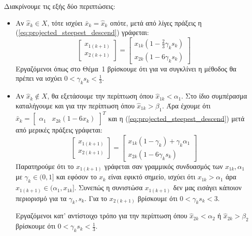 \documentclass[a4paper,12pt]{article}
\begin{document}
Διακρίνουμε τις εξής δύο περιπτώσεις:
\begin{itemize}
    \item Αν $\hat{x}_k \in X$, τότε ισχύει $\bar{x}_k = \hat{x}_k$ οπότε, μετά από λίγες πράξεις η 
    (\ref{eq:projected_steepest_descend}) γράφεται:
    \begin{equation}
        \begin{bmatrix} x_{1(k+1)} \\ x_{2(k+1)} \end{bmatrix} = 
        \begin{bmatrix} x_{1k} \left(1 - \frac{2}{3} \gamma_k s_k \right) \\ x_{2k} (1 - 6 \gamma_k s_k) \end{bmatrix}
    \end{equation}
    Εργαζόμενοι όπως στο Θέμα~1 βρίσκουμε ότι για να συγκλίνει η μέθοδος θα πρέπει να ισχύει 
    $0 < \gamma_k s_k < \frac{1}{3}$.

    \item Αν $\hat{x}_k \notin X$, θα εξετάσουμε την περίπτωση όπου $\hat{x}_{1k} < \alpha_1$.
    Στο ίδιο συμπέρασμα καταλήγουμε και για την περίπτωση όπου $\hat{x}_{1k} > \beta_1$. Άρα έχουμε
    ότι $\bar{x}_k = \begin{bmatrix} \alpha_1 & x_{2k} (1 - 6 x_k)\end{bmatrix}^T$ και η 
    (\ref{eq:projected_steepest_descend}) μετά από μερικές πράξεις γράφεται:
    \begin{equation}
        \begin{bmatrix} x_{1(k+1)} \\ x_{2(k+1)} \end{bmatrix} = 
        \begin{bmatrix} x_{1k} (1 - \gamma_k) + \gamma_k \alpha_1 \\ x_{2k} (1 - 6 \gamma_k s_k) \end{bmatrix}
    \end{equation}
    Παρατηρούμε ότι το $x_{1(k+1)}$ γράφεται σαν γραμμικός συνδυασμός των $x_{1k}, \alpha_1$ με $\gamma_k \in (0, 1]$
    και εφόσον το $x_k$ είναι εφικτό σημείο, ισχύει ότι $x_{1k} > \alpha_1$ άρα $x_{1(k+1)} \in (\alpha_1, x_{1k}]$.
    Συνεπώς η συνιστώσα $x_{1(k+1)}$ δεν μας εισάγει κάποιον περιορισμό για τα $\gamma_k, s_k$. Για το $x_{2(k+1)}$ 
    βρίσκουμε ότι $0 < \gamma_k s_k < 3$. 
    
    Εργαζόμενοι κατ' αντίστοιχο τρόπο για την περίπτωση όπου $\hat{x}_{2k} < \alpha_2$ ή $\hat{x}_{2k} > \beta_2$
    βρίσκουμε ότι $0 < \gamma_k s_k < \frac{1}{3}$.
\end{itemize}
\end{document}
